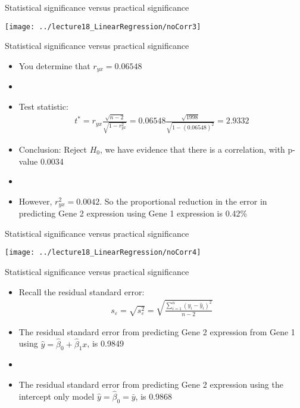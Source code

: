\documentclass[xcolor=dvipsnames]{beamer}
\begin{document}
\begin{frame}{Statistical significance versus practical significance}
	\begin{center}
		\texttt{[image: ../lecture18\_LinearRegression/noCorr3]}
	\end{center}
\end{frame}

\begin{frame}{Statistical significance versus practical significance}
	\begin{itemize}
	\item You determine that $r_{yx} = 0.06548$
	\item[]
	\item Test statistic:
	\begin{gather*}
		t^* = r_{yx} \frac{\sqrt{n-2}}{\sqrt{1-r^2_{yx}}} = 0.06548 \frac{\sqrt{1998}}{\sqrt{1-(0.06548)^2}} = 2.9332
	\end{gather*}
	\item Conclusion: Reject $H_0$, we have evidence that there is a correlation, with p-value 0.0034
	\item[]
	\item However, $ r_{yx}^2 = 0.0042$. So the proportional reduction in the error in predicting Gene 2 expression using Gene 1 expression is 0.42\%
	\end{itemize}
\end{frame}

\begin{frame}{Statistical significance versus practical significance}
	\begin{center}
		\texttt{[image: ../lecture18\_LinearRegression/noCorr4]}
	\end{center}
\end{frame}

\begin{frame}{Statistical significance versus practical significance}
	\begin{itemize}
		\item Recall the residual standard error: 
		\begin{gather*}
		s_{\varepsilon} = \sqrt{s^2_{\varepsilon}} = \sqrt{\frac{\sum_{i=1}^{n}\left(y_i - \hat{y}_i\right)^2}{n-2}}
		\end{gather*} 
		\item The residual standard error from predicting Gene 2 expression from Gene 1 using $\hat{y} = \hat{\beta}_0 + \hat{\beta}_1 x$, is 0.9849
		\item[]
		\item The residual standard error from predicting Gene 2 expression using the intercept only model $\hat{y}=\hat{\beta}_0 = \bar{y}$, is 0.9868
	\end{itemize}
\end{frame}
\end{document}
